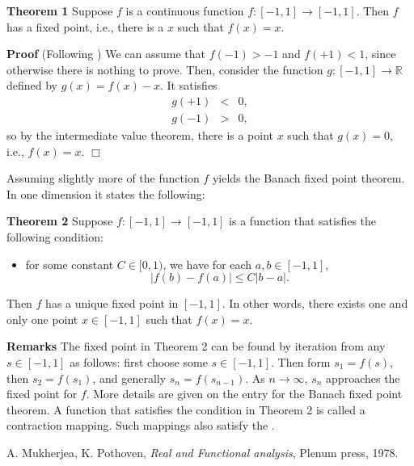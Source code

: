 \documentclass[12pt]{article}
\newcommand{\sR}[0]{\mathbb{R}}
\begin{document}
{\bf Theorem 1} \cite{mukherjea, adams}
Suppose $f$ is a continuous function
$f:[-1,1]\to [-1,1]$. Then $f$ has a fixed point, i.e.,
there is a $x$ such that $f(x)=x$.

{\bf Proof} (Following \cite{mukherjea})
We can assume that $f(-1)>-1$ and $f(+1)<1$, since otherwise
there is nothing to prove. Then, consider the function $g:[-1,1]\to \sR$
defined by $g(x)=f(x)-x$. It satisfies
\begin{eqnarray*}
g(+1) &<& 0,\\
g(-1) &>& 0,
\end{eqnarray*}
so by the intermediate value theorem, there is a point $x$
such that $g(x)=0$, i.e., $f(x)=x$. $\Box$

Assuming slightly more of the function $f$ yields the
Banach fixed point theorem. In one dimension it states the following:

{\bf Theorem 2} Suppose $f:[-1,1]\to [-1,1]$ is a function that satisfies the 
following condition:
\begin{itemize}
\item[] for some constant $C\in[0,1)$, we have for each $a,b\in[-1,1]$, 
$$|f(b)-f(a)|\le C |b-a|.$$
\end{itemize}
Then $f$ has  a unique fixed point in $[-1,1]$. In other words, there exists
one and only one point $x\in[-1,1]$ such that $f(x)=x$. 

{\bf Remarks}
The fixed point in Theorem 2 can be found by iteration from any $s\in[-1,1]$ as follows: 
first choose some $s\in[-1,1]$. 
Then form $s_1=f(s)$, then $s_2=f(s_1)$, and generally $s_n=f(s_{n-1})$. 
As $n\to \infty$, $s_n$ approaches the fixed point for $f$. More details 
are given on the entry for the Banach fixed point theorem. 
A function that satisfies the
 condition in Theorem 2 is called a contraction mapping. Such mappings also satisfy the
.

\begin{thebibliography}{9}
 A. Mukherjea, K. Pothoven,
 \emph{Real and Functional analysis},
 Plenum press, 1978.
 \end{thebibliography}
\end{document}
